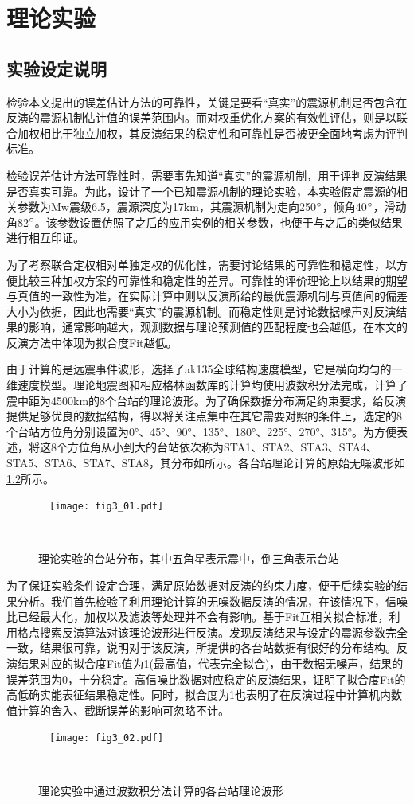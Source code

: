 

\chapter{理论实验}

\section{实验设定说明}
检验本文提出的误差估计方法的可靠性，关键是要看“真实”的震源机制是否包含在反演的震源机制估计值的误差范围内。而对权重优化方案的有效性评估，则是以联合加权相比于独立加权，其反演结果的稳定性和可靠性是否被更全面地考虑为评判标准。

检验误差估计方法可靠性时，需要事先知道“真实”的震源机制，用于评判反演结果是否真实可靠。为此，设计了一个已知震源机制的理论实验，本实验假定震源的相关参数为Mw震级6.5，震源深度为17km，其震源机制为走向250$^\circ$，倾角40$^\circ$，滑动角82$^\circ$。该参数设置仿照了之后的应用实例的相关参数，也便于与之后的类似结果进行相互印证。

为了考察联合定权相对单独定权的优化性，需要讨论结果的可靠性和稳定性，以方便比较三种加权方案的可靠性和稳定性的差异。可靠性的评价理论上以结果的期望与真值的一致性为准，在实际计算中则以反演所给的最优震源机制与真值间的偏差大小为依据，因此也需要“真实”的震源机制。而稳定性则是讨论数据噪声对反演结果的影响，通常影响越大，观测数据与理论预测值的匹配程度也会越低，在本文的反演方法中体现为拟合度Fit越低。

由于计算的是远震事件波形，选择了ak135全球结构速度模型\citep{Kennett1995}，它是横向均匀的一维速度模型。理论地震图和相应格林函数库的计算均使用波数积分法完成，计算了震中距为4500km的8个台站的理论波形。为了确保数据分布满足约束要求，给反演提供足够优良的数据结构，得以将关注点集中在其它需要对照的条件上，选定的8个台站方位角分别设置为0°、45°、90°、135°、180°、225°、270°、315°。为方便表述，将这8个方位角从小到大的台站依次称为STA1、STA2、STA3、STA4、STA5、STA6、STA7、STA8，其分布如所示。各台站理论计算的原始无噪波形如\ref{fig3_02}所示。
\begin{figure}
\centering
  \texttt{[image: fig3\_01.pdf]}
  \caption{理论实验的台站分布，其中五角星表示震中，倒三角表示台站}
  \label{fig3_01}
\end{figure}

为了保证实验条件设定合理，满足原始数据对反演的约束力度，便于后续实验的结果分析。我们首先检验了利用理论计算的无噪数据反演的情况，在该情况下，信噪比已经最大化，加权以及滤波等处理并不会有影响。基于Fit互相关拟合标准，利用格点搜索反演算法对该理论波形进行反演。发现反演结果与设定的震源参数完全一致，结果很可靠，说明对于该反演，所提供的各台站数据有很好的分布结构。反演结果对应的拟合度Fit值为1(最高值，代表完全拟合)，由于数据无噪声，结果的误差范围为0，十分稳定。高信噪比数据对应稳定的反演结果，证明了拟合度Fit的高低确实能表征结果稳定性。同时，拟合度为1也表明了在反演过程中计算机内数值计算的舍入、截断误差的影响可忽略不计。
\begin{figure}
\centering
  \texttt{[image: fig3\_02.pdf]}
  \caption{理论实验中通过波数积分法计算的各台站理论波形}
  \label{fig3_02}
\end{figure}

